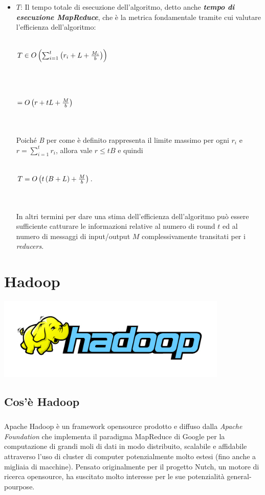 \documentclass[a4paper,11pt]{report}
\begin{document}
\begin{itemize}
(\emph{coppie}) che transitano nella 
\emph{shuffle network} a un dato istante.
 \item $T$: Il tempo totale di esecuzione dell'algoritmo, detto anche \emph{\textbf{tempo di esecuzione MapReduce}}, che è la metrica
fondamentale tramite cui valutare 
l'efficienza dell'algoritmo:\\\\
      \centerline{$T \in O \left( \sum_{i=1}^t \left({r_i + L + {M_i \over b}} \right) \right)  $ }\\\\
      \centerline{ $= O\left(r+tL+{M\over b}\right)$}\\\\
Poiché \emph{B} per come è definito rappresenta il limite massimo per ogni $r_i$ e $r=\sum_{i=1}^t r_i$, allora vale $r \le tB$ e quindi
\\\\
\centerline{$T = O\left( t \left( B + L \right) + {M \over b} \right)$.}\\\\
In altri termini per dare una stima dell'efficienza dell'algoritmo può essere sufficiente catturare le informazioni relative al numero di
round $t$ ed al numero di messaggi di 
input/output $M$ complessivamente transitati per i \emph{reducers}.
\end{itemize}



\chapter{Hadoop}
\centerline{\includegraphics[width=110mm]{images/hadoop+elephant_rgb.png}}
\paragraph{}
\section {Cos'è Hadoop}
\paragraph{} Apache Hadoop è un framework opensource prodotto e diffuso dalla \emph{Apache Foundation} che implementa il paradigma MapReduce
di Google per la computazione di grandi 
moli di dati in modo distribuito, scalabile e affidabile attraverso l'uso di cluster di computer potenzialmente molto estesi (fino anche a
migliaia di macchine).
Pensato originalmente per il progetto Nutch, un motore di ricerca opensource, ha suscitato molto interesse per le sue potenzialità
general-pourpose.
\end{document}
